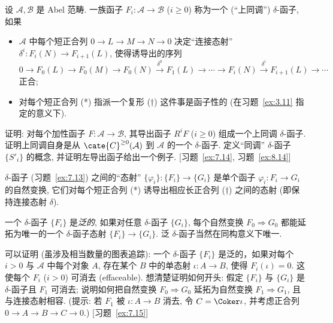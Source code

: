 \begin{prob}\label{ex:7.13}
设 $\mathcal{A},\mathcal{B}$ 是 Abel 范畴. 一族函子 $F_i:\mathcal{A}\to\mathcal{B}$ ($i\ge 0$) 称为一个 (``上同调'') $\delta$-函子, 如果
\begin{itemize}
\item $\mathcal{A}$ 中每个短正合列 $0\to L\to M\to N\to 0$ 决定``连接态射'' $\delta^i:F_i(N)\to F_{i+1}(L)$, 使得诱导出的序列
\[
0\to F_0(L)\to F_0(M)\to F_0(N)\xrightarrow{\ \delta^0\ }F_1(L)\to\cdots\to F_i(N)\xrightarrow{\ \delta^i\ }F_{i+1}(L)\to\cdots
\]
正合;
\item 对每个短正合列 (*) 指派一个复形 (†) 这件事是函子性的 (在习题~\ref{ex:3.11} 指定的意义下).
\end{itemize}
证明: 对每个加性函子 $F:\mathcal{A}\to\mathcal{B}$, 其导出函子 $R^i F$ ($i\ge 0$) 组成一个上同调 $\delta$-函子. 证明上同调自身是从 $\cate{C}^{\ge0}(\mathcal{A})$ 到 $\mathcal{A}$ 的一个 $\delta$-函子.
定义``同调'' $\delta$-函子 $\{S'_i\}$ 的概念, 并证明左导出函子给出一个例子. [习题~\ref{ex:7.14}, 习题~\ref{ex:8.14}]
\end{prob}

\begin{prob}\label{ex:7.14}
$\delta$-函子 (习题~\ref{ex:7.13}) 之间的``态射'' $\{\varphi_i\}:\{F_i\}\to\{G_i\}$ 是单个函子 $\varphi_i:F_i\to G_i$ 的自然变换, 它们对每个短正合列 (*) 诱导出相应长正合列 (†) 之间的态射 (即保持连接态射 $\delta$).

一个 $\delta$-函子 $\{F_i\}$ 是\emph{泛的}, 如果对任意 $\delta$-函子 $\{G_i\}$, 每个自然变换 $F_0\Rightarrow G_0$ 都能延拓为唯一的一个 $\delta$-函子态射 $\{F_i\}\to\{G_i\}$.
泛 $\delta$-函子当然在同构意义下唯一.

可以证明 (虽涉及相当数量的图表追踪): 一个 $\delta$-函子 $\{F_i\}$ 是泛的，如果对每个 $i>0$ 与 $\mathcal{A}$ 中每个对象 $A$, 存在某个 $B$ 中的单态射 $\iota:A\to B$, 使得 $F_i(\iota)=0$. 这使每个 $F_i$ ($i>0$) 可消去 (effaceable). 想清楚证明如何开头: 假定 $\{F_i\}$ 与 $\{G_i\}$ 是 $\delta$-函子且 $F_1$ 可消去; 说明如何把自然变换 $F_0\Rightarrow G_0$ 延拓为自然变换 $F_1\Rightarrow G_1$, 且与连接态射相容. (提示: 若 $F_1$ 被 $\iota:A\to B$ 消去, 令 $C=\Coker\iota$, 并考虑正合列 $0\to A\to B\to C\to 0$.) [习题~\ref{ex:7.15}]
\end{prob}

